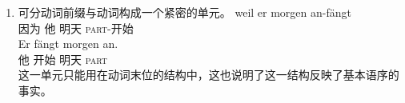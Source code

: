 \begin{enumerate}
\item 可分动词前缀与动词构成一个紧密的单元。
\eal
\ex 
\gll weil er morgen an-fängt\\
     因为 他 明天 \textsc{part}-开始\\
\ex 
\gll Er fängt morgen an.\\
	 他 开始 明天 \textsc{part}\\
\zl
这一单元只能用在动词末位的结构中，这也说明了这一结构反映了基本语序的事实。


\end{enumerate}
